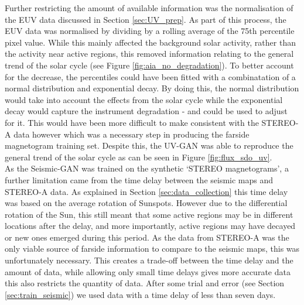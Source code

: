 \documentclass[11pt,a4paper,onecolumn]{report}
\begin{document}
Further restricting the amount of available information was the normalisation of
the EUV data discussed in Section \ref{sec:UV_prep}. As part of this process,
the EUV data was normalised by dividing by a rolling average of the 75th
percentile pixel value. While this mainly affected the background solar
activity, rather than the activity near active regions, this removed information
relating to the general trend of the solar cycle (see Figure
\ref{fig:aia_no_degradation}). To better account for the decrease, the
percentiles could have been fitted with a combinatation of a normal distribution
and exponential decay. By doing this, the normal distribution would take
into account the effects from the solar cycle while the exponential decay would
capture the instrument degradation - and could be used to adjust for it. This
would have been more difficult to make consistent with the STEREO-A data however
which was a necessary step in producing the farside magnetogram training set.
Despite this, the UV-GAN was able to reproduce the general trend of the
solar cycle as can be seen in Figure \ref{fig:flux_sdo_uv}. \\


As the Seismic-GAN was trained on the synthetic `STEREO magnetograms', a further
limitation came from the time delay between the seismic maps and STEREO-A data.
As explained in Section \ref{sec:data_collection} this time delay was based on
the average rotation of Sunspots. However due to the differential rotation of
the Sun, this still meant that some active regions may be in different locations
after the delay, and more importantly, active regions may have decayed or new
ones emerged during this period. As the data from STEREO-A was the only viable
source of farside information to compare to the seismic maps, this was
unfortunately necessary. This creates a trade-off between the time delay and the
amount of data, while allowing only small time delays gives more accurate data
this also restricts the quantity of data. After some trial and error (see
Section \ref{sec:train_seismic}) we used data with a time delay of less than
seven days. \\
\end{document}
